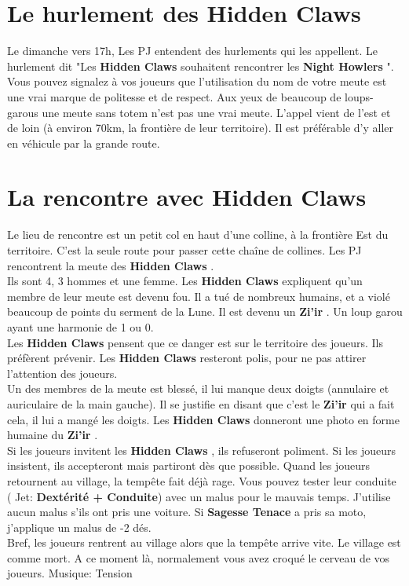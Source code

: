 \documentclass[oneside,12pt]{book}
\newcommand\roll[1]{
( Jet: \textbf{#1})
}
\newcommand{\Jessica}{\textbf{Sagesse Tenace} }
\newcommand{\Thomas}{\textbf{Zi'ir} }
\newcommand{\Night}{\textbf{Night Howlers} }
\newcommand{\Hidden}{\textbf{Hidden Claws} }
\begin{document}
\begin{flushleft}
\section{Le hurlement des \Hidden}
Le dimanche vers 17h, Les PJ entendent des hurlements qui les appellent.  
Le hurlement dit "Les \Hidden souhaitent rencontrer les \Night ". Vous pouvez signalez à vos joueurs que l'utilisation du nom de votre meute est une vrai marque de politesse et de respect. Aux yeux de beaucoup de loups-garous une meute sans totem n'est pas une vrai meute. 
L'appel vient de l'est et de loin (à environ 70km, la frontière de leur territoire). Il est préférable d'y aller en véhicule par la grande route.

\section{La rencontre avec \Hidden}
Le lieu de rencontre est un petit col en haut d'une colline, à la frontière Est du territoire. C'est la seule route pour passer cette chaîne de collines.
Les PJ rencontrent la meute des \Hidden.\\ Ils sont 4, 3 hommes et une femme.
Les \Hidden expliquent qu'un membre de leur meute est devenu fou. Il a tué de nombreux humains, et a violé beaucoup de points du serment de la Lune. Il est devenu un \Thomas. Un loup garou ayant une harmonie de 1 ou 0. \\
Les \Hidden pensent que ce danger est sur le territoire des joueurs. Ils préfèrent prévenir. Les \Hidden resteront polis, pour ne pas attirer l'attention des joueurs. \\
Un des membres de la meute est blessé, il lui manque deux doigts (annulaire et auriculaire de la main gauche). Il se justifie en disant que c'est le \Thomas qui a fait cela, il lui a mangé les doigts. Les \Hidden donneront une photo en forme humaine du \Thomas.\\
Si les joueurs invitent les \Hidden, ils refuseront poliment. Si les joueurs insistent, ils accepteront mais partiront dès que possible.
Quand les joueurs retournent au village, la tempête fait déjà rage. Vous pouvez tester leur conduite \roll{Dextérité + Conduite} avec un malus pour le mauvais temps. J'utilise aucun malus s'ils ont pris une voiture. Si \Jessica a pris sa moto, j'applique un malus de -2 dés.\\
Bref, les joueurs rentrent au village alors que la tempête arrive vite. Le village est comme mort. A ce moment là, normalement vous avez croqué le cerveau de vos joueurs.  
Musique: Tension



\end{flushleft}
\end{document}
